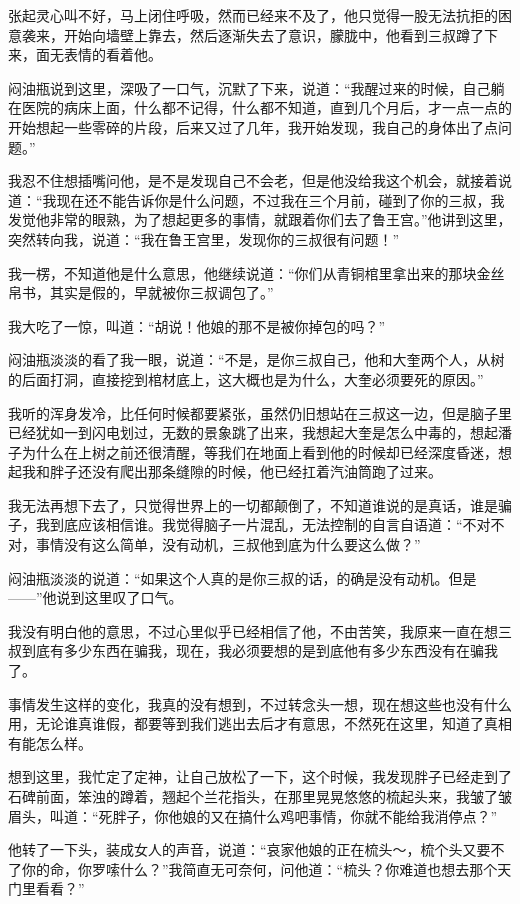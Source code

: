 张起灵心叫不好，马上闭住呼吸，然而已经来不及了，他只觉得一股无法抗拒的困意袭来，开始向墙壁上靠去，然后逐渐失去了意识，朦胧中，他看到三叔蹲了下来，面无表情的看着他。

闷油瓶说到这里，深吸了一口气，沉默了下来，说道：“我醒过来的时候，自己躺在医院的病床上面，什么都不记得，什么都不知道，直到几个月后，才一点一点的开始想起一些零碎的片段，后来又过了几年，我开始发现，我自己的身体出了点问题。”

我忍不住想插嘴问他，是不是发现自己不会老，但是他没给我这个机会，就接着说道：“我现在还不能告诉你是什么问题，不过我在三个月前，碰到了你的三叔，我发觉他非常的眼熟，为了想起更多的事情，就跟着你们去了鲁王宫。”他讲到这里，突然转向我，说道：“我在鲁王宫里，发现你的三叔很有问题！”

我一楞，不知道他是什么意思，他继续说道：“你们从青铜棺里拿出来的那块金丝帛书，其实是假的，早就被你三叔调包了。”

我大吃了一惊，叫道：“胡说！他娘的那不是被你掉包的吗？”

闷油瓶淡淡的看了我一眼，说道：“不是，是你三叔自己，他和大奎两个人，从树的后面打洞，直接挖到棺材底上，这大概也是为什么，大奎必须要死的原因。”

我听的浑身发冷，比任何时候都要紧张，虽然仍旧想站在三叔这一边，但是脑子里已经犹如一到闪电划过，无数的景象跳了出来，我想起大奎是怎么中毒的，想起潘子为什么在上树之前还很清醒，等我们在地面上看到他的时候却已经深度昏迷，想起我和胖子还没有爬出那条缝隙的时候，他已经扛着汽油筒跑了过来。

我无法再想下去了，只觉得世界上的一切都颠倒了，不知道谁说的是真话，谁是骗子，我到底应该相信谁。我觉得脑子一片混乱，无法控制的自言自语道：“不对不对，事情没有这么简单，没有动机，三叔他到底为什么要这么做？”

闷油瓶淡淡的说道：“如果这个人真的是你三叔的话，的确是没有动机。但是——”他说到这里叹了口气。

我没有明白他的意思，不过心里似乎已经相信了他，不由苦笑，我原来一直在想三叔到底有多少东西在骗我，现在，我必须要想的是到底他有多少东西没有在骗我了。

事情发生这样的变化，我真的没有想到，不过转念头一想，现在想这些也没有什么用，无论谁真谁假，都要等到我们逃出去后才有意思，不然死在这里，知道了真相有能怎么样。

想到这里，我忙定了定神，让自己放松了一下，这个时候，我发现胖子已经走到了石碑前面，笨浊的蹲着，翘起个兰花指头，在那里晃晃悠悠的梳起头来，我皱了皱眉头，叫道：“死胖子，你他娘的又在搞什么鸡吧事情，你就不能给我消停点？”

他转了一下头，装成女人的声音，说道：“哀家他娘的正在梳头～，梳个头又要不了你的命，你罗嗦什么？”我简直无可奈何，问他道：“梳头？你难道也想去那个天门里看看？”


